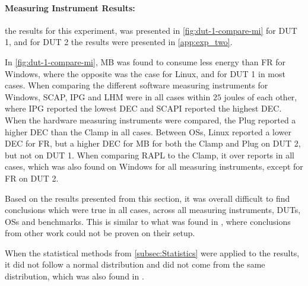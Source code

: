\paragraph{Measuring Instrument Results:} %
the results for this experiment, was presented in \cref{fig:dut-1-compare-mi} for DUT 1, and for DUT 2 the results were presented in \cref{app:exp_two}. 

In \cref{fig:dut-1-compare-mi}, MB was found to consume less energy than FR for Windows, where the opposite was the case for Linux, and for DUT 1 in most cases. When comparing the different software measuring instruments for Windows, SCAP, IPG and LHM were in all cases within $25$ joules of each other, where IPG reported the lowest DEC and SCAPI reported the highest DEC. When the hardware measuring instruments were compared, the Plug reported a higher DEC than the Clamp in all cases. Between OSs, Linux reported a lower DEC for FR, but a higher DEC for MB for both the Clamp and Plug on DUT 2, but not on DUT 1. When comparing RAPL to the Clamp, it over reports in all cases, which was also found on Windows for all measuring instruments, except for FR on DUT 2.

Based on the results presented from this section, it was overall difficult to find conclusions which were true in all cases, across all measuring instruments, DUTs, OSs and benchmarks. This is similar to what was found in \cite{Ournani2020}, where conclusions from other work could not be proven on their setup.







When the statistical methods from \cref{subsec:Statistics} were applied to the results, it did not follow a normal distribution and did not come from the same distribution, which was also found in \cite{biksbois, Koedijk2022diff}.%


